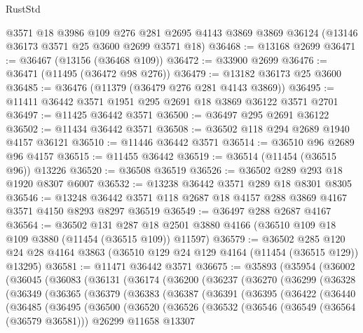 \begin{lexlean}{RustStd}
\begin{coremodule}
    @3571
    @18
    @3986
    @109
    @276
    @281
    @2695
    @4143
    @3869
    @3869
    @36124
    (@13146 @36173 @3571 @25 @3600 @2699 @3571 @18)
@36468 := @13168 @2699
@36471 := @36467 (@13156 (@36468 @109))
@36472 := @33900 @2699
@36476 := @36471 (@11495 (@36472 @98 @276))
@36479 := @13182 @36173 @25 @3600
@36485 := @36476 (@11379 (@36479 @276 @281 @4143 @3869))
@36495 := @11411 @36442 @3571 @1951 @295 @2691 @18 @3869 @36122 @3571 @2701
@36497 := @11425 @36442 @3571
@36500 := @36497 @295 @2691 @36122
@36502 := @11434 @36442 @3571
@36508 := @36502 @118 @294 @2689 @1940 @4157 @36121
@36510 := @11446 @36442 @3571
@36514 := @36510 @96 @2689 @96 @4157
@36515 := @11455 @36442
@36519 := @36514 (@11454 (@36515 @96)) @13226
@36520 := @36508 @36519
@36526 := @36502 @289 @293 @18 @1920 @8307 @6007
@36532 := @13238 @36442 @3571 @289 @18 @8301 @8305
@36546 := @13248 @36442 @3571 @118 @2687 @18 @4157 @288 @3869 @4167 @3571 @4150 @8293 @8297 @36519
@36549 := @36497 @288 @2687 @4167
@36564 := @36502
    @131
    @287
    @18
    @2501
    @3880
    @4166
    (@36510 @109 @18 @109 @3880 (@11454 (@36515 @109)) @11597)
@36579 := @36502
    @285
    @120
    @24
    @28
    @4164
    @3863
    (@36510 @129 @24 @129 @4164 (@11454 (@36515 @129)) @13295)
@36581 := @11471 @36442 @3571
@36675 := @35893
    (@35954
      (@36002
        (@36045
          (@36083
            (@36131
              (@36174
                (@36200
                  (@36237
                    (@36270
                      (@36299
                        (@36328
                          (@36349
                            (@36365
                              (@36379
                                (@36383
                                  (@36387
                                    (@36391
                                      (@36395
                                        (@36422
                                          (@36440
                                            (@36485
                                              (@36495
                                                (@36500
                                                  (@36520
                                                    (@36526
                                                      (@36532
                                                        (@36546
                                                          (@36549 (@36564 (@36579 @36581)))
                                                          @26299
                                                          @11658
                                                          @13307

\end{coremodule}
\end{lexlean}
